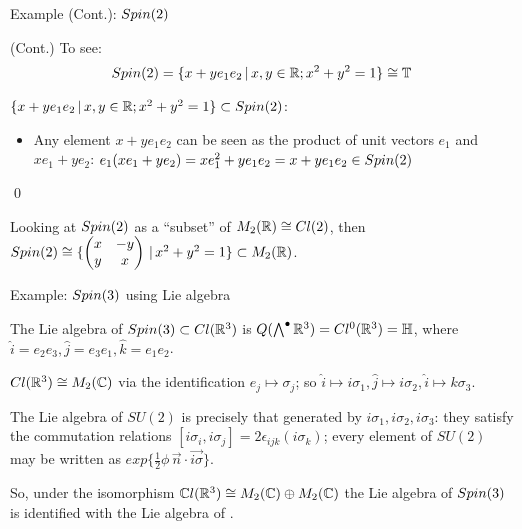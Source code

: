 \begin{frame}{Example (Cont.): $Spin(2)$} %
    
    (Cont.) To see: \[Spin(2) = \{x + y e_1 e_2 \,|\, x, y \in \mathbb R;  x^2 + y^2 = 1\} \cong \mathbb T\]
    
    $\{x + y e_1 e_2 \,|\, x, y \in \mathbb R;  x^2 + y^2 = 1\} \subset Spin(2)$:
        
        \begin{itemize}
        
        \item Any element $x + y e_1 e_2$ can be seen as the product of unit vectors $e_1$ and $x e_1 + y e_2$: $e_1 (x e_1 + y e_2) = x e_1^2 + y e_1 e_2 = x + y e_1 e_2 \in Spin(2)$
            
        \end{itemize}
    \qed
    
    Looking at $Spin(2)$ as a ``subset'' of $M_2(\mathbb R) \cong Cl(2)$, then $Spin(2) \cong \{\begin{pmatrix} x & -y \\ y & x \end{pmatrix} \,|\, x^2 + y^2 = 1\} \subset M_2(\mathbb R)$.
    
\end{frame}

\begin{frame}{Example: $Spin(3)$ using Lie algebra} %

    The Lie algebra of $Spin(3) \subset Cl(\mathbb R^3)$ is $Q(\bigwedge^\bullet \mathbb R^3) = Cl^0(\mathbb R^3) = \mathbb H$, where $\hat i = e_2 e_3, \hat j = e_3 e_1, \hat k = e_1 e_2$.
    
    $Cl(\mathbb R^3) \cong M_2(\mathbb C)$ via the identification $e_j \mapsto \sigma_j$; so $\hat i \mapsto i \sigma_1, \hat j \mapsto i \sigma_2, \hat i \mapsto k \sigma_3$.
    
    The Lie algebra of $SU(2)$ is precisely that generated by $i\sigma_1, i\sigma_2, i\sigma_3$: they satisfy the commutation relations $[i\sigma_i, i \sigma_j] = 2 \epsilon_{ijk} (i \sigma_k)$; every element of $SU(2)$ may be written as $exp\{\frac{1}{2} \phi \, \vec n \cdot \vec{i \sigma}\}$.
    
    So, under the isomorphism $\mathbb C l(\mathbb R^3) \cong M_2(\mathbb C) \oplus M_2(\mathbb C)$ the Lie algebra of $Spin(3)$ is identified with the Lie algebra of .
    
\end{frame}

